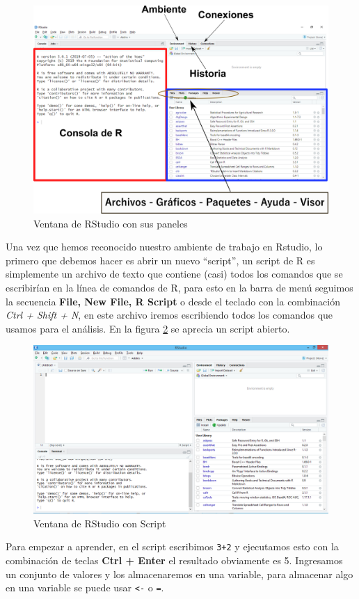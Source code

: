 \documentclass[
]{krantz}
\begin{document}
\begin{figure}[h!]

{\centering \includegraphics[width=0.5\linewidth]{rstudiotabs} 

}

\caption{Ventana de RStudio con sus paneles}\label{fig:rstudiotabs}
\end{figure}

Una vez que hemos reconocido nuestro ambiente de trabajo en Rstudio, lo primero que debemos hacer es abrir un nuevo ``script'', un script de R es simplemente un archivo de texto que contiene (casi) todos los comandos que se escribirían en la línea de comandos de R, para esto en la barra de menú seguimos la secuencia \textbf{File, New File, R Script} o desde el teclado con la combinación \emph{Ctrl + Shift + N}, en este archivo iremos escribiendo todos los comandos que usamos para el análisis. En la figura \ref{fig:rstudio2} se aprecia un script abierto.

\begin{figure}[h!]

{\centering \includegraphics[width=0.5\linewidth]{rstudio2} 

}

\caption{Ventana de RStudio con Script}\label{fig:rstudio2}
\end{figure}

Para empezar a aprender, en el script escribimos \texttt{3+2} y ejecutamos esto con la combinación de teclas \textbf{Ctrl + Enter} el resultado obviamente es 5. Ingresamos un conjunto de valores y los almacenaremos en una variable, para almacenar algo en una variable se puede usar \texttt{\textless{}-} o \texttt{=}.
\end{document}
